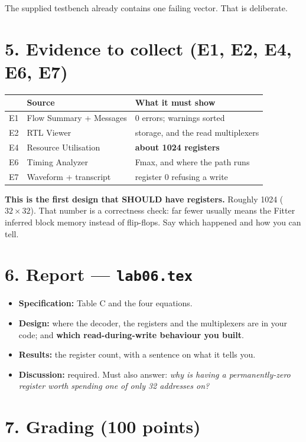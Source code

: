 \documentclass[11pt]{article}
\newcommand{\code}[1]{\texttt{#1}}
\begin{document}
The supplied testbench already contains one failing vector. That is deliberate.

\section*{5. Evidence to collect (E1, E2, E4, E6, E7)}

\begin{center}
\begin{tabular}{lll}
\toprule
& Source & What it must show \\
\midrule
E1 & Flow Summary + Messages & 0 errors; warnings sorted \\
E2 & RTL Viewer & storage, and the read multiplexers \\
E4 & Resource Utilisation & \textbf{about 1024 registers} \\
E6 & Timing Analyzer & Fmax, and where the path runs \\
E7 & Waveform + transcript & register 0 refusing a write \\
\bottomrule
\end{tabular}
\end{center}

\textbf{This is the first design that SHOULD have registers.} Roughly 1024
($32 \times 32$). That number is a correctness check: far fewer usually means
the Fitter inferred block memory instead of flip-flops. Say which happened and
how you can tell.

\section*{6. Report --- \code{lab06.tex}}

\begin{itemize}[leftmargin=1.6em,itemsep=1pt]
\item \textbf{Specification:} Table C and the four equations.
\item \textbf{Design:} where the decoder, the registers and the multiplexers
are in your code; and \textbf{which read-during-write behaviour you built}.
\item \textbf{Results:} the register count, with a sentence on what it tells you.
\item \textbf{Discussion:} required. Must also answer: \emph{why is having a
permanently-zero register worth spending one of only 32 addresses on?}
\end{itemize}

\section*{7. Grading (100 points)}
\end{document}
